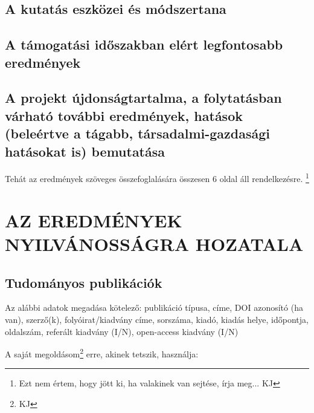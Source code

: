 \documentclass[graybox,envcountchap,sectrefs]{svmono}
\begin{document}
\subsection{A kutatás eszközei és módszertana}

\subsection{A támogatási időszakban elért legfontosabb eredmények}

\subsection{A projekt újdonságtartalma, a folytatásban várható további eredmények, hatások (beleértve a tágabb, társadalmi-gazdasági hatásokat is) bemutatása}

Tehát az eredmények szöveges összefoglalására összesen 6 oldal áll rendelkezésre. \footnote{Ezt nem értem, hogy jött ki, ha valakinek van sejtése, írja meg... KJ}

\section{AZ EREDMÉNYEK NYILVÁNOSSÁGRA HOZATALA}

\subsection{Tudományos publikációk}

Az alábbi adatok megadása kötelező: publikáció típusa, címe, DOI azonosító (ha van), szerző(k), folyóirat/kiadvány címe, sorszáma, kiadó, kiadás helye, időpontja, oldalszám, referált kiadvány (I/N), open-access kiadvány (I/N)

A saját megoldásom\footnote{KJ} erre, akinek tetszik, használja:
\end{document}
